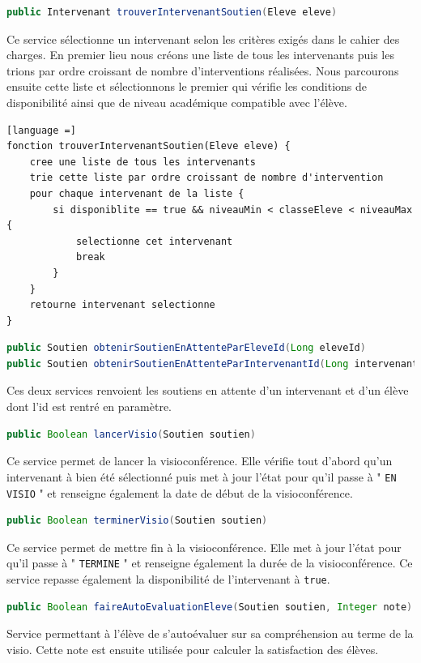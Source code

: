 \begin{lstlisting}[language = Java]
public Intervenant trouverIntervenantSoutien(Eleve eleve)
\end{lstlisting}
Ce service sélectionne un intervenant selon les critères exigés dans le cahier des charges. En premier lieu nous créons une liste de tous les intervenants puis les trions par ordre croissant de nombre d'interventions réalisées. Nous parcourons ensuite cette liste et sélectionnons le premier qui vérifie les conditions de disponibilité ainsi que de niveau académique compatible avec l'élève.

\begin{lstlisting}[language =]
fonction trouverIntervenantSoutien(Eleve eleve) {      
    cree une liste de tous les intervenants
    trie cette liste par ordre croissant de nombre d'intervention
    pour chaque intervenant de la liste {
        si disponiblite == true && niveauMin < classeEleve < niveauMax {
            selectionne cet intervenant
            break
        }
    }
    retourne intervenant selectionne
}
\end{lstlisting}

\begin{lstlisting}[language = Java]
public Soutien obtenirSoutienEnAttenteParEleveId(Long eleveId)
public Soutien obtenirSoutienEnAttenteParIntervenantId(Long intervenantId)
\end{lstlisting}
Ces deux services renvoient les soutiens en attente d'un intervenant et d'un élève dont l'id est rentré en paramètre.

\begin{lstlisting}[language = Java]
public Boolean lancerVisio(Soutien soutien)
\end{lstlisting}
Ce service permet de lancer la visioconférence. Elle vérifie tout d'abord qu'un intervenant à bien été sélectionné puis met à jour l'état pour qu'il passe à " \texttt{EN VISIO} " et renseigne également la date de début de la visioconférence.

\begin{lstlisting}[language = Java]
public Boolean terminerVisio(Soutien soutien)
\end{lstlisting}
Ce service permet de mettre fin à la visioconférence. Elle met à jour l'état pour qu'il passe à " \texttt{TERMINE} " et renseigne également la durée de la visioconférence. Ce service repasse également la disponibilité de l'intervenant à \texttt{true}.
\begin{lstlisting}[language = Java]
public Boolean faireAutoEvaluationEleve(Soutien soutien, Integer note)
\end{lstlisting}
Service permettant à l'élève de s'autoévaluer sur sa compréhension au terme de la visio. Cette note est ensuite utilisée pour calculer la satisfaction des élèves.

